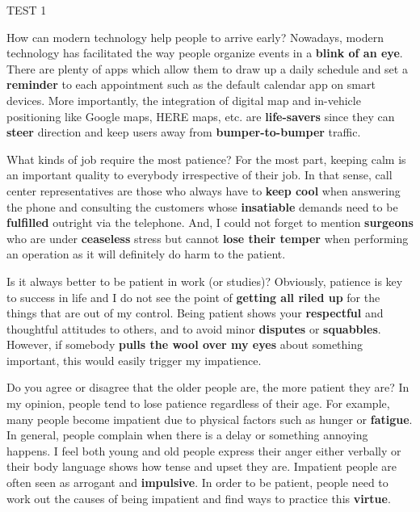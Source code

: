 \begin{glossarymc}[Cambridge 12]
\begin{test}{TEST 1}
    \begin{qa}{How can modern technology help people to arrive early?}
    Nowadays, modern technology has facilitated the way people organize events in a \textbf{blink of an eye}. There are plenty of apps which allow them to draw up a daily schedule and set a \textbf{reminder} to each appointment such as the default calendar app on smart devices. More importantly, the integration of digital map and in-vehicle positioning like Google maps, HERE maps, etc. are \textbf{life-savers} since they can \textbf{steer} direction and keep users away from \textbf{bumper-to-bumper} traffic.
    \end{qa}

    \begin{qa}{What kinds of job require the most patience?}
    For the most part, keeping calm is an important quality to everybody irrespective of their job. In that sense, call center representatives are those who always have to \textbf{keep cool} when answering the phone and consulting the customers whose \textbf{insatiable} demands need to be \textbf{fulfilled} outright via the telephone. And, I could not forget to mention \textbf{surgeons} who are under \textbf{ceaseless} stress but cannot \textbf{lose their temper} when performing an operation as it will definitely do harm to the patient.
    \end{qa}

    \begin{qa}{Is it always better to be patient in work (or studies)?}
    Obviously, patience is key to success in life and I do not see the point of \textbf{getting all riled up} for the things that are out of my control. Being patient shows your \textbf{respectful} and thoughtful attitudes to others, and to avoid minor \textbf{disputes} or \textbf{squabbles}. However, if somebody \textbf{pulls the wool over my eyes} about something important, this would easily trigger my impatience.
    \end{qa}

    \begin{qa}{Do you agree or disagree that the older people are, the more patient they are?}
    In my opinion, people tend to lose patience regardless of their age. For example, many people become impatient due to physical factors such as hunger or \textbf{fatigue}. In general, people complain when there is a delay or something annoying happens. I feel both young and old people express their anger either verbally or their body language shows how tense and upset they are. Impatient people are often seen as arrogant and \textbf{impulsive}. In order to be patient, people need to work out the causes of being impatient and find ways to practice this \textbf{virtue}.
    \end{qa}


\end{test}
\end{glossarymc}
